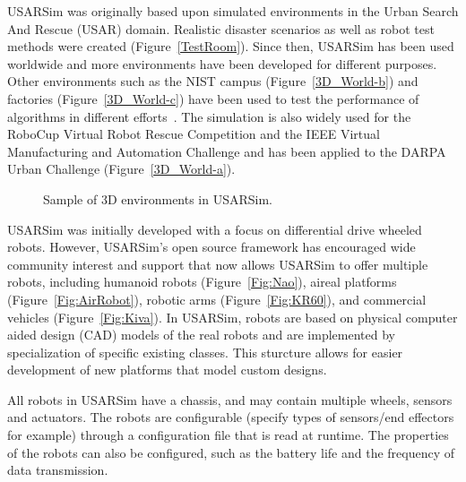 USARSim was originally based upon simulated environments in the Urban Search And Rescue (USAR) domain. Realistic disaster scenarios as well as robot test methods were created (Figure~\ref{TestRoom}).
Since then, USARSim has been used worldwide and more environments have been developed for different purposes. Other environments such as the NIST campus (Figure~\ref{3D_World-b}) and factories (Figure~\ref{3D_World-c}) have been used to test the performance of algorithms in different efforts~\cite{WANG.HFES.2005,BALAGUER.IROS.2008,KOOTBALLY.ITEA.2010}. The simulation is also widely used for the RoboCup Virtual Robot Rescue Competition \cite{RoboCupWeb} and the IEEE Virtual Manufacturing and Automation Challenge \cite{VMACWeb} and has been applied to the DARPA Urban Challenge (Figure~\ref{3D_World-a}).

\begin{figure}[t!]
\centering
{}\qquad
{}\qquad
{}\qquad%
\caption{Sample of 3D environments in USARSim.} \label{3D_World}
\end{figure}

USARSim was initially developed with a focus on differential drive wheeled robots. However, USARSim's open source framework has encouraged wide community interest and support that now allows USARSim to offer multiple robots, including humanoid robots (Figure~\ref{Fig:Nao}), aireal platforms (Figure~\ref{Fig:AirRobot}), robotic arms (Figure~\ref{Fig:KR60}), and commercial vehicles (Figure~\ref{Fig:Kiva}). In USARSim, robots are based on physical computer aided design (CAD) models of the real
robots and are implemented by specialization of specific existing classes. This sturcture allows for easier development of new platforms that model custom designs.

All robots in USARSim have a chassis, and may contain multiple wheels, sensors and
actuators. The robots are configurable (specify types of
sensors/end effectors for example) through a configuration file that is read at runtime. The properties of the robots can
also be configured, such as the battery life and the frequency of
data transmission.


